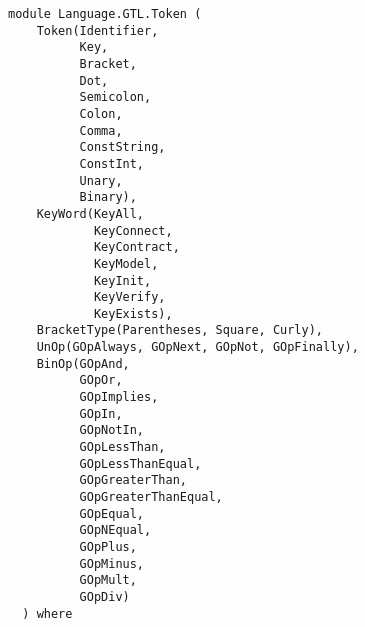 \label{module:Language.GTL.Token}
\haddockbeginheader
{\haddockverb\begin{verbatim}
module Language.GTL.Token (
    Token(Identifier,
          Key,
          Bracket,
          Dot,
          Semicolon,
          Colon,
          Comma,
          ConstString,
          ConstInt,
          Unary,
          Binary), 
    KeyWord(KeyAll,
            KeyConnect,
            KeyContract,
            KeyModel,
            KeyInit,
            KeyVerify,
            KeyExists), 
    BracketType(Parentheses, Square, Curly), 
    UnOp(GOpAlways, GOpNext, GOpNot, GOpFinally), 
    BinOp(GOpAnd,
          GOpOr,
          GOpImplies,
          GOpIn,
          GOpNotIn,
          GOpLessThan,
          GOpLessThanEqual,
          GOpGreaterThan,
          GOpGreaterThanEqual,
          GOpEqual,
          GOpNEqual,
          GOpPlus,
          GOpMinus,
          GOpMult,
          GOpDiv)
  ) where\end{verbatim}}
\haddockendheader

